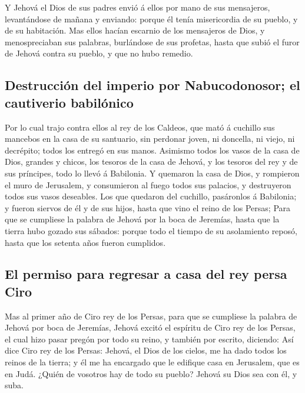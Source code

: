 Y Jehová el Dios de sus padres envió á ellos por mano de
sus mensajeros, levantándose de mañana y enviando: porque él tenía
misericordia de su pueblo, y de su habitación.  Mas ellos
hacían escarnio de los mensajeros de Dios, y menospreciaban sus
palabras, burlándose de sus profetas, hasta que subió el furor de Jehová
contra su pueblo, y que no hubo remedio.

\hypertarget{destrucciuxf3n-del-imperio-por-nabucodonosor-el-cautiverio-babiluxf3nico}{%
\subsection{Destrucción del imperio por Nabucodonosor; el cautiverio
babilónico}\label{destrucciuxf3n-del-imperio-por-nabucodonosor-el-cautiverio-babiluxf3nico}}

 Por lo cual trajo contra ellos al rey de los Caldeos,
que mató á cuchillo sus mancebos en la casa de su santuario, sin
perdonar joven, ni doncella, ni viejo, ni decrépito; todos los entregó
en sus manos.  Asimismo todos los vasos de la casa de
Dios, grandes y chicos, los tesoros de la casa de Jehová, y los tesoros
del rey y de sus príncipes, todo lo llevó á Babilonia.  Y
quemaron la casa de Dios, y rompieron el muro de Jerusalem, y
consumieron al fuego todos sus palacios, y destruyeron todos sus vasos
deseables.  Los que quedaron del cuchillo, pasáronlos á
Babilonia; y fueron siervos de él y de sus hijos, hasta que vino el
reino de los Persas;  Para que se cumpliese la palabra de
Jehová por la boca de Jeremías, hasta que la tierra hubo gozado sus
sábados: porque todo el tiempo de su asolamiento reposó, hasta que los
setenta años fueron cumplidos.

\hypertarget{el-permiso-para-regresar-a-casa-del-rey-persa-ciro}{%
\subsection{El permiso para regresar a casa del rey persa
Ciro}\label{el-permiso-para-regresar-a-casa-del-rey-persa-ciro}}

 Mas al primer año de Ciro rey de los Persas, para que se
cumpliese la palabra de Jehová por boca de Jeremías, Jehová excitó el
espíritu de Ciro rey de los Persas, el cual hizo pasar pregón por todo
su reino, y también por escrito, diciendo:  Así dice Ciro
rey de los Persas: Jehová, el Dios de los cielos, me ha dado todos los
reinos de la tierra; y él me ha encargado que le edifique casa en
Jerusalem, que es en Judá. ¿Quién de vosotros hay de todo su pueblo?
Jehová su Dios sea con él, y suba.
